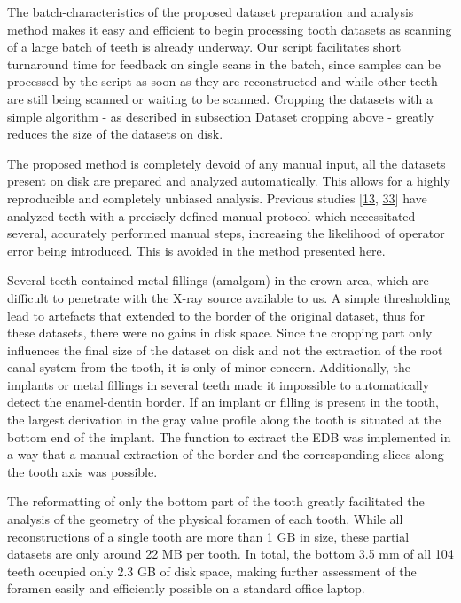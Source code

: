 \documentclass[
  american,
]{article}
\begin{document}
The batch-characteristics of the proposed dataset preparation and analysis method makes it easy and efficient to begin processing tooth datasets as scanning of a large batch of teeth is already underway.
Our script facilitates short turnaround time for feedback on single scans in the batch, since samples can be processed by the script as soon as they are reconstructed and while other teeth are still being scanned or waiting to be scanned.
Cropping the datasets with a simple algorithm - as described in subsection \protect\hyperlink{dataset-cropping}{Dataset cropping} above - greatly reduces the size of the datasets on disk.

The proposed method is completely devoid of any manual input, all the datasets present on disk are prepared and analyzed automatically.
This allows for a highly reproducible and completely unbiased analysis.
Previous studies {[}\protect\hyperlink{ref-19SVNdOdA}{13}, \protect\hyperlink{ref-jsWNcnau}{33}{]} have analyzed teeth with a precisely defined manual protocol which necessitated several, accurately performed manual steps, increasing the likelihood of operator error being introduced.
This is avoided in the method presented here.

Several teeth contained metal fillings (amalgam) in the crown area, which are difficult to penetrate with the X-ray source available to us.
A simple thresholding lead to artefacts that extended to the border of the original dataset, thus for these datasets, there were no gains in disk space.
Since the cropping part only influences the final size of the dataset on disk and not the extraction of the root canal system from the tooth, it is only of minor concern.
Additionally, the implants or metal fillings in several teeth made it impossible to automatically detect the enamel-dentin border.
If an implant or filling is present in the tooth, the largest derivation in the gray value profile along the tooth is situated at the bottom end of the implant.
The function to extract the EDB was implemented in a way that a manual extraction of the border and the corresponding slices along the tooth axis was possible.

The reformatting of only the bottom part of the tooth greatly facilitated the analysis of the geometry of the physical foramen of each tooth.
While all reconstructions of a single tooth are more than 1 GB in size, these partial datasets are only around 22 MB per tooth.
In total, the bottom 3.5 mm of all 104 teeth occupied only 2.3 GB of disk space, making further assessment of the foramen easily and efficiently possible on a standard office laptop.
\end{document}
